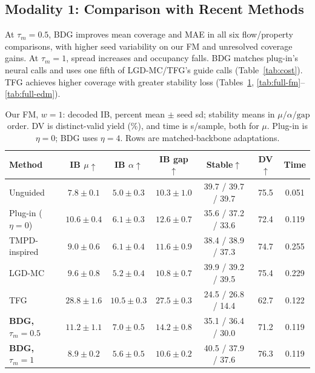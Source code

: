 \documentclass{article}
\begin{document}
\subsection{Modality 1: Comparison with Recent Methods}\label{sec:recent}
At $\tau_m=0.5$, BDG improves mean coverage and MAE in all six flow/property comparisons, with higher seed variability on our FM and unresolved coverage gains. At $\tau_m=1$, spread increases and occupancy falls. BDG matches plug-in's neural calls and uses one fifth of LGD-MC/TFG's guide calls (Table~\ref{tab:cost}). TFG achieves higher coverage with greater stability loss (Tables~\ref{tab:recent}, \ref{tab:full-fm}--\ref{tab:full-edm}).
\begin{table}[!htbp]
\centering\small
\caption{Our FM, $w=1$: decoded IB, percent mean $\pm$ seed sd; stability means in $\mu/\alpha/\mathrm{gap}$ order. DV is distinct-valid yield (\%), and time is s/sample, both for $\mu$. Plug-in is $\eta=0$; BDG uses $\eta=4$. Rows are matched-backbone adaptations.}
\label{tab:recent}
\begin{tabular}{lcccccc}
\toprule
Method & IB $\mu\uparrow$ & IB $\alpha\uparrow$ & IB gap$\uparrow$ & Stable$\uparrow$ & DV$\uparrow$ & Time\\
\midrule
Unguided & $7.8\pm0.1$ & $5.0\pm0.3$ & $10.3\pm1.0$ & 39.7 / 39.7 / 39.7 & 75.5 & 0.051\\
Plug-in ($\eta=0$) & $10.6\pm0.4$ & $6.1\pm0.3$ & $12.6\pm0.7$ & 35.6 / 37.2 / 33.6 & 72.4 & 0.119\\
TMPD-inspired & $9.0\pm0.6$ & $6.1\pm0.4$ & $11.6\pm0.9$ & 38.4 / 38.9 / 37.3 & 74.7 & 0.255\\
LGD-MC & $9.6\pm0.8$ & $5.2\pm0.4$ & $10.8\pm0.7$ & 39.9 / 39.2 / 39.5 & 75.4 & 0.229\\
TFG & $28.8\pm1.6$ & $10.5\pm0.3$ & $27.5\pm0.3$ & 24.5 / 26.8 / 14.4 & 62.7 & 0.122\\
\textbf{BDG, $\tau_m=0.5$} & $11.2\pm1.1$ & $7.0\pm0.5$ & $14.2\pm0.8$ & 35.1 / 36.4 / 30.0 & 71.2 & 0.119\\
\textbf{BDG, $\tau_m=1$} & $8.9\pm0.2$ & $5.6\pm0.5$ & $10.6\pm0.2$ & 40.5 / 37.9 / 37.6 & 76.3 & 0.119\\
\bottomrule
\end{tabular}
\end{table}
\end{document}
